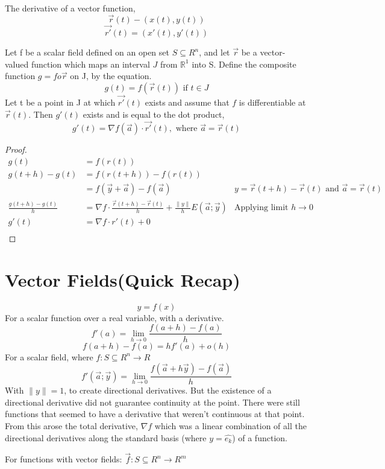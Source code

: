 \documentclass[twoside]{report}
\begin{document}
The derivative of a vector function,
\[
   \vec{r} (t) - (x(t),y(t))
\]
\[
   \vec{r'}(t) = (x'(t),y'(t))
\]
\begin{theorem} 
 Let f be a scalar field defined on an open set $S 
   \subseteq R^n$, and let $\vec{r}$ be a vector-valued function which maps an interval $J$ from $\mathbb{R}^1$ into S. Define the composite function $g = f o \vec{r}$ on J, by the equation.
\[
   g(t) = f(\vec{r}(t)) \text{ if } t \in J
\]	
Let t be a point in J at which $\vec{r'}(t)$ exists and assume that $f$ is differentiable at $\vec{r}(t)$. Then $g'(t)$ exists and is equal to the dot product,
\[
   g'(t) = \nabla f(\vec{a}) \cdot \vec{r'}(t), \text{ where } \vec{a} = \vec{r}(t)
\]
\end{theorem}
\begin{proof}
\begin{align*}
g(t) &= f(r(t)) \\
g(t+h) - g(t) &= f(r(t+h)) - f(r(t)) \\
	      &= f(\vec{y} + \vec{a}) - f(\vec{a}) &\text{$y = \vec{r}(t+h)- \vec{r}(t)$ and $\vec{a} = \vec{r}(t)$} \\
\frac{g(t+h) - g(t)}{h} &= \nabla f \cdot \frac{\vec{r}(t+h) - \vec{r}(t)}{h} + \frac{\|y\|}{h} E(\vec{a};\vec{y}) &\text{Applying limit $h \rightarrow 0$}\\
g'(t) &= \nabla f \cdot r'(t)  + 0 \\
\end{align*}
\end{proof}
\section{Vector Fields(Quick Recap)}
\[
	y = f(x)
\]
For a scalar function over a real variable, with a derivative.
\[
	f'(a) = \lim_{h \rightarrow 0}\frac{f(a+h) - f(a)}{h}
\] 
\[ 
	f(a+h) - f(a) = hf'(a) + o(h)
\]
For a scalar field, where $f : S \subseteq R^n \rightarrow R$
\[ 
f'(\vec{a};\vec{y}) = \lim_{h \rightarrow 0} \frac{f(\vec{a} + h \vec{y}) - f(\vec{a})}{h}
\]
With $\|y\| = 1$, to create directional derivatives.
But the existence of a directional derivative did not guarantee continuity at the point. There were still functions that seemed to have a derivative that weren't continuous at that point.
From this arose the total derivative, $\nabla f$ which was a linear combination of all the directional derivatives along the standard basis (where $y = \hat{e_k}$) of a function.

For functions with vector fields: $\vec{f} : S \subseteq R^n \rightarrow R^m$
\end{document}
